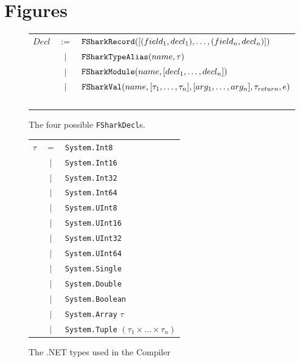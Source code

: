 \section{Figures}
\begin{figure}
  \centering
\begin{tabular}{@{}l c l}%
  $Decl$ & $:=$    & $\text{\ttfamily FSharkRecord}([(field_1, decl_1),\ldots,(field_n, decl_n)])$ \\
         & $\vert$ & $\text{\ttfamily FSharkTypeAlias}(name, \tau)$ \\
         & $\vert$ & $\text{\ttfamily FSharkModule}(name, [decl_1,\ldots, decl_n])$\\
         & $\vert$ & $\text{\ttfamily FSharkVal}(name, [\tau_1, \ldots, \tau_n], [arg_1, \ldots, arg_n], \tau_{return}, e)$\\
  ~ \\
\end{tabular}
\caption{The four possible \texttt{FSharkDecl}s.}
\label{fig:fsharkdecls}
\end{figure}

\begin{figure}
  \centering
\begin{tabular}{l c l}%
   $\tau$& $=$     &  \texttt{System.Int8} \\
         & $\vert$ &  \texttt{System.Int16} \\
         & $\vert$ &  \texttt{System.Int32} \\
         & $\vert$ &  \texttt{System.Int64} \\
         & $\vert$ &  \texttt{System.UInt8} \\
         & $\vert$ &  \texttt{System.UInt16} \\
         & $\vert$ &  \texttt{System.UInt32} \\
         & $\vert$ &  \texttt{System.UInt64} \\
         & $\vert$ &  \texttt{System.Single} \\
         & $\vert$ &  \texttt{System.Double} \\
         & $\vert$ &  \texttt{System.Boolean} \\
         & $\vert$ &  \texttt{System.Array} $\tau$ \\
         & $\vert$ &  \texttt{System.Tuple} $(\tau_1 \times \ldots \times \tau_n)$ \\
\end{tabular}
\caption{The .NET types used in the \fshark{}Compiler}
\label{fig:fsharptypes0}
\end{figure}



